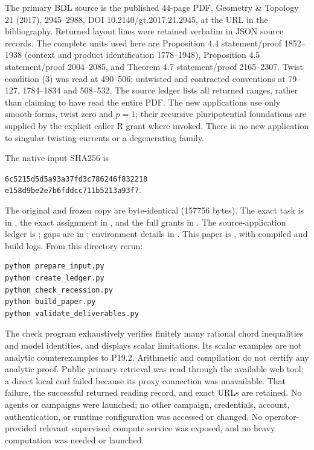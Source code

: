 \documentclass[11pt]{article}
\begin{document}
The primary BDL source is the published 44-page PDF,
Geometry \& Topology 21 (2017), 2945--2988, DOI
10.2140/gt.2017.21.2945, at the URL in the bibliography.
Returned layout lines were retained verbatim in JSON source records.
The complete units used here are Proposition 4.4 statement/proof
1852--1938 (context and product identification 1778--1948),
Proposition 4.5 statement/proof 2004--2085, and Theorem 4.7
statement/proof 2165--2307. Twist condition (3) was read at
490--506; untwisted and contracted conventions at 79--127,
1784--1834 and 508--532. The source ledger lists all returned
ranges, rather than claiming to have read the entire PDF.
The new applications use only smooth forms, twist zero and $p=1$;
their recursive pluripotential foundations are supplied by the
explicit caller R grant where invoked. There is no new application
to singular twisting currents or a degenerating family.

The native input SHA256 is
\begin{center}\small\texttt{6c5215d5d5a93a37fd3c786246f832218}\\
\texttt{e158d9be2e7b6fddcc711b5213a93f7}.
\end{center}
The original and frozen copy are byte-identical (157756 bytes).
The exact task is in , the exact assignment
in , and the full grants in
. The source-application ledger is
; gaps are in
; environment details in
. This paper is ,
with compiled  and build logs.
From this directory rerun:
\begin{verbatim}
python prepare_input.py
python create_ledger.py
python check_recession.py
python build_paper.py
python validate_deliverables.py
\end{verbatim}
The check program exhaustively verifies finitely many rational chord
inequalities and model identities, and displays scalar limitations.
Its scalar examples are not analytic counterexamples to P19.2.
Arithmetic and compilation do not certify any analytic proof.
Public primary retrieval was read through the available web tool;
a direct local curl failed because its proxy connection was unavailable.
That failure, the successful returned reading record, and exact URLs
are retained. No agents or campaigns were launched; no other campaign,
credentials, account, authentication, or runtime configuration was
accessed or changed. No operator-provided relevant supervised compute
service was exposed, and no heavy computation was needed or launched.
\end{document}
